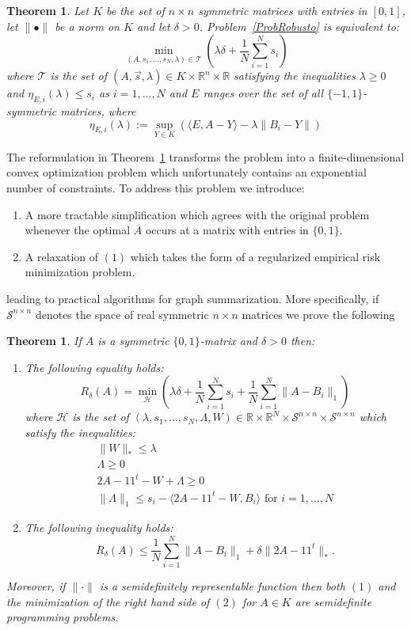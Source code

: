 \documentclass[12pt]{amsart}
\newtheorem{theorem}[lemma]{Theorem}
\theoremstyle{remark}
\newcommand{\RR}{\mathbb{R}}
\begin{document}
\begin{theorem}\label{thm: finiteConvex} Let $K$ be the set of $n\times n$ symmetric matrices with entries in $[0,1]$, let $\|\bullet\|$ be a norm on $K$ and let $\delta>0$. Problem~\ref{ProbRobusto} is equivalent to:
\[\min_{(A,s_1,\dots, s_N,\lambda)\in \mathcal{T}}\left( \lambda\delta +\frac{1}{N}\sum_{i=1}^N s_i \right)\]
where $\mathcal{T}$ is the set of $(A,\vec{s},\lambda)\in K\times \RR^n\times \RR$  satisfying the inequalities $\lambda\geq 0$ and $\eta_{E, i}(\lambda)\leq s_i$ as $i=1,\dots, N$ and $E$ ranges over the set of all $\{-1,1\}$-symmetric matrices, where
\[\eta_{E, i}(\lambda):= \sup_{Y\in K} \left(\langle E, A-Y\rangle -\lambda \|B_i-Y\|\right)\]
\end{theorem}

The reformulation in Theorem~\ref{thm: finiteConvex} transforms the problem into a finite-dimensional convex optimization problem which unfortunately contains  an exponential number of constraints. To address this problem we introduce:
\begin{enumerate}
\item A more tractable simplification which agrees with the original problem whenever the optimal $\overline{A}$ occurs at a matrix with entries in $\{0,1\}$.
\item A relaxation of $(1)$ which takes the form of a regularized empirical risk minimization problem.
\end{enumerate}
leading to practical algorithms for graph summarization. More specifically, if $\mathcal{S}^{n\times n}$ denotes the space of real symmetric $n\times n$ matrices we prove the following 

\begin{theorem}\label{Thm: tractable}If $A$ is a symmetric $\{0,1\}$-matrix and $\delta>0$ then:
\begin{enumerate}
\item{  The following equality holds:
\[
R_{\delta}(A)=\min_{\mathcal{H}} \left(\lambda\delta +\frac{1}{N}\sum_{i=1}^N s_i+\frac{1}{N}\sum_{i=1}^N\|A-B_i\|_1\right)
\]
where $\mathcal{H}$ is the set of $(\lambda, s_1,\dots, s_N,\Lambda, W)\in \RR\times\RR^N\times \mathcal{S}^{n\times n} \times \mathcal{S}^{n\times n}$ which satisfy the inequalities:
\[
\begin{array}{l}
\|W\|_{*}\leq \lambda\\
\Lambda \geq 0\\
2A-11^t-W + \Lambda \geq 0\\
\|\Lambda\|_{1}\leq s_i-\langle 2A-11^t-W, B_i\rangle\text{ for $i=1,\dots, N$}
\end{array}
\]}
\item The following inequality holds:
\[R_{\delta}(A)\leq \frac{1}{N}\sum_{i=1}^N\|A-B_i\|_1+ \delta\|2A-11^t\|_*.\]
\end{enumerate}
Moreover, if $\|\cdot\|$ is a semidefinitely representable function then both $(1)$ and the minimization of the right hand side of $(2)$ for $A\in K$ are semidefinite programming problems.
\end{theorem}
\end{document}
